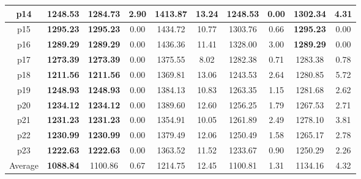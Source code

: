 \begin{table*}[]
{\begin{tabular}{@{}cccccccccc@{}}
			\midrule
			p14 & \textbf{1248.53} & 1284.73 & 2.90 & 1413.87 & 13.24 & \textbf{1248.53} & 0.00 & 1302.34 & 4.31 \\
			\midrule
			p15 & \textbf{1295.23} & \textbf{1295.23} & 0.00 & 1434.72 & 10.77 & 1303.76 & 0.66 & \textbf{1295.23} & 0.00 \\
			\midrule
			p16 & \textbf{1289.29} & \textbf{1289.29} & 0.00 & 1436.36 & 11.41 & 1328.00 & 3.00 & \textbf{1289.29} & 0.00 \\
			\midrule
			p17 & \textbf{1273.39} & \textbf{1273.39} & 0.00 & 1375.55 & 8.02 & 1282.38 & 0.71 & 1283.38 & 0.78 \\
			\midrule
			p18 & \textbf{1211.56} & \textbf{1211.56} & 0.00 & 1369.81 & 13.06 & 1243.53 & 2.64 & 1280.85 & 5.72 \\
			\midrule
			p19 & \textbf{1248.93} & \textbf{1248.93} & 0.00 & 1384.13 & 10.83 & 1263.35 & 1.15 & 1281.68 & 2.62 \\
			\midrule
			p20 & \textbf{1234.12} & \textbf{1234.12} & 0.00 & 1389.60 & 12.60 & 1256.25 & 1.79 & 1267.53 & 2.71 \\
			\midrule
			p21 & \textbf{1231.23} & \textbf{1231.23} & 0.00 & 1354.91 & 10.05 & 1261.89 & 2.49 & 1278.10 & 3.81 \\
			\midrule
			p22 & \textbf{1230.99} & \textbf{1230.99} & 0.00 & 1379.49 & 12.06 & 1250.49 & 1.58 & 1265.17 & 2.78 \\
			\midrule
			p23 & \textbf{1222.63} & \textbf{1222.63} & 0.00 & 1363.52 & 11.52 & 1233.67 & 0.90 & 1250.29 & 2.26 \\
			\midrule
			Average & \textbf{1088.84} & 1100.86 & 0.67 & 1214.75 & 12.45 & 1100.81 & 1.31 & 1134.16 & 4.32 \\
			\bottomrule
		\end{tabular}%
	}
\end{table*}
